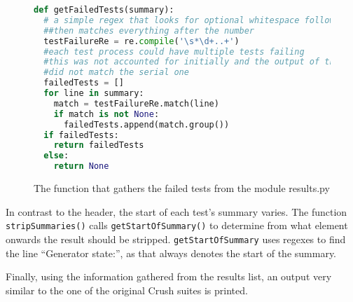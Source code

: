 \begin{figure}[h]
\begin{lstlisting}[language=Python]
def getFailedTests(summary):
  # a simple regex that looks for optional whitespace followed by a number
  ##then matches everything after the number
  testFailureRe = re.compile('\s*\d+..+')
  #each test process could have multiple tests failing 
  #this was not accounted for initially and the output of the parallel Testu01
  #did not match the serial one
  failedTests = []
  for line in summary:
    match = testFailureRe.match(line)
    if match is not None:
      failedTests.append(match.group())
  if failedTests:
    return failedTests
  else:
    return None       
\end{lstlisting}
\caption{The function that gathers the failed tests from the module results.py}
\label{fig:getFailedTests}
\end{figure}

In contrast to the header, the start of each test's summary varies. The function \texttt{stripSummaries()} calls \texttt{getStartOfSummary()} to determine from what element onwards the result should be stripped. \texttt{getStartOfSummary} uses regexes to find the line ``Generator state:'', as that always denotes the start of the summary.

Finally, using the information gathered from the results list, an output very similar to the one of the original Crush suites is printed.
